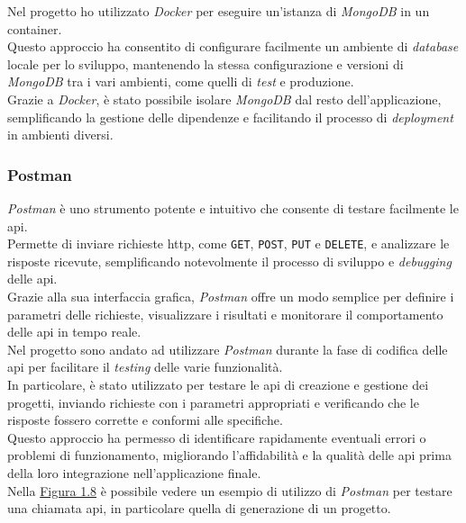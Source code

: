 \noindent Nel progetto ho utilizzato \textit{Docker} per eseguire un'istanza di \textit{MongoDB} in un \gls{container}.\\
Questo approccio ha consentito di configurare facilmente un ambiente di \textit{database} locale per lo sviluppo, mantenendo la stessa configurazione e versioni di \textit{MongoDB} tra i vari ambienti, come quelli di \textit{test} e produzione.\\
Grazie a \textit{Docker}, è stato possibile isolare \textit{MongoDB} dal resto dell'applicazione, semplificando la gestione delle dipendenze e facilitando il processo di \textit{deployment} in ambienti diversi.

\subsubsection{Postman}

\textit{Postman} è uno strumento potente e intuitivo che consente di testare facilmente le \gls{api}.\\
Permette di inviare richieste \gls{http}, come \texttt{GET}, \texttt{POST}, \texttt{PUT} e \texttt{DELETE}, e analizzare le risposte ricevute, semplificando notevolmente il processo di sviluppo e \textit{debugging} delle \gls{api}.\\
Grazie alla sua interfaccia grafica, \textit{Postman} offre un modo semplice per definire i parametri delle richieste, visualizzare i risultati e monitorare il comportamento delle \gls{api} in tempo reale.\\

\noindent Nel progetto sono andato ad utilizzare \textit{Postman} durante la fase di codifica delle \gls{api} per facilitare il \textit{testing} delle varie funzionalità.\\
In particolare, è stato utilizzato per testare le \gls{api} di creazione e gestione dei progetti, inviando richieste con i parametri appropriati e verificando che le risposte fossero corrette e conformi alle specifiche.\\ 
Questo approccio ha permesso di identificare rapidamente eventuali errori o problemi di funzionamento, migliorando l'affidabilità e la qualità delle \gls{api} prima della loro integrazione nell'applicazione finale.\\

\noindent Nella {\hyperref[fig:postman]{Figura 1.8}} è possibile vedere un esempio di utilizzo di \textit{Postman} per testare una chiamata \gls{api}, in particolare quella di generazione di un progetto.


